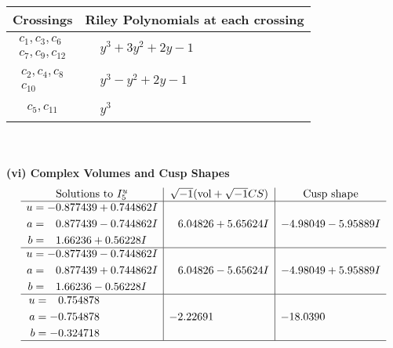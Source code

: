 \documentclass[1p]{elsarticle_modified}
\theoremstyle{definition}
\newcommand{\I}{\sqrt{-1}}
\begin{document}
\begin{tabular}{m{50pt}|m{274pt}}
Crossings & \hspace{64pt}Riley Polynomials at each crossing \\
\hline $$\begin{aligned}c_{1},c_{3},c_{6}\\c_{7},c_{9},c_{12}\end{aligned}$$&$\begin{aligned}
&y^3+3 y^2+2 y-1
\end{aligned}$\\
\hline $$\begin{aligned}c_{2},c_{4},c_{8}\\c_{10}\end{aligned}$$&$\begin{aligned}
&y^3- y^2+2 y-1
\end{aligned}$\\
\hline $$\begin{aligned}c_{5},c_{11}\end{aligned}$$&$\begin{aligned}
&y^3
\end{aligned}$\\
\hline
\end{tabular}\\~\\
\newpage\flushleft \textbf{(vi) Complex Volumes and Cusp Shapes}
$$\begin{array}{c|c|c}  
\text{Solutions to }I^u_{5}& \I (\text{vol} + \sqrt{-1}CS) & \text{Cusp shape}\\
 \hline 
\begin{aligned}
u &= -0.877439 + 0.744862 I \\
a &= \phantom{-}0.877439 - 0.744862 I \\
b &= \phantom{-}1.66236 + 0.56228 I\end{aligned}
 & \phantom{-}6.04826 + 5.65624 I & -4.98049 - 5.95889 I \\ \hline\begin{aligned}
u &= -0.877439 - 0.744862 I \\
a &= \phantom{-}0.877439 + 0.744862 I \\
b &= \phantom{-}1.66236 - 0.56228 I\end{aligned}
 & \phantom{-}6.04826 - 5.65624 I & -4.98049 + 5.95889 I \\ \hline\begin{aligned}
u &= \phantom{-}0.754878\phantom{ +0.000000I} \\
a &= -0.754878\phantom{ +0.000000I} \\
b &= -0.324718\phantom{ +0.000000I}\end{aligned}
 & -2.22691\phantom{ +0.000000I} & -18.0390\phantom{ +0.000000I}\\
 \hline 
 \end{array}$$\newpage\newpage\renewcommand{\arraystretch}{1}
\end{document}
